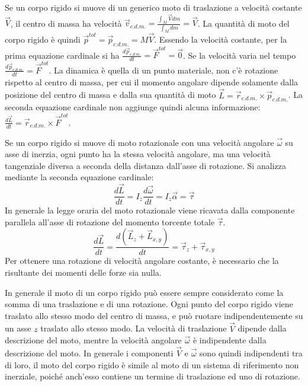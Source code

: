 \documentclass{article}
\numberwithin{equation}{subsection}
\begin{document}
Se un corpo rigido si muove di un generico moto di traslazione a velocità costante $\vec{V}$, 
il centro di massa ha velocità $\vec{v}_{c.d.m.}=\displaystyle\frac{\int_M\vec{V}dm}{\int_M dm}=\vec{V}$. La quantità di moto del corpo rigido è quindi 
$\vec{p}^{tot}=\vec{p}_{c.d.m.}=M\vec{V}$. Essendo la velocità costante, per la prima equazione cardinale si ha $\displaystyle\frac{d\vec{p}_{c.d.m.}}{dt}=\vec{F}^{tot}=\vec0$. 
Se la velocità varia nel tempo $\displaystyle\frac{d\vec{p}_{c.d.m.}}{dt}=\vec{F}^{tot}$. 
La dinamica è quella di un punto materiale, non c'è rotazione rispetto al centro di massa, per cui il 
momento angolare dipende solamente dalla posizione del centro di massa e dalla sua quantità di moto $\vec L=\vec{r}_{c.d.m.}\times\vec{p}_{c.d.m.}$. La seconda 
equazione cardinale non aggiunge quindi alcuna informazione: $\displaystyle\frac{d\vec{L}}{dt}=\vec{r}_{c.d.m.}\times\vec{F}^{tot}$. 



Se un corpo rigido si muove di moto rotazionale con una velocità 
angolare $\vec{\omega}$ su asse di inerzia, ogni punto ha la stessa velocità angolare, ma una velocità tangenziale diversa a seconda della distanza 
dall'asse di rotazione. Si analizza mediante la seconda equazione cardinale:
\begin{equation}
    \displaystyle\frac{d\vec{L}}{dt}=I_z\frac{d\vec\omega}{dt}=I_z\vec\alpha=\vec{\tau}
\end{equation}
In generale la legge oraria del moto rotazionale viene ricavata dalla componente parallela all'asse di rotazione del momento torcente totale $\vec{\tau}$. 
\begin{equation*}
    \displaystyle\frac{d\vec{L}}{dt}=\frac{d(\vec{L}_z+\vec{L}_{x,y})}{dt}=\vec{\tau}_z+\vec{\tau}_{x,y}
\end{equation*}
Per ottenere una rotazione di velocità angolare costante, è necessario che la risultante dei momenti delle forze sia nulla. 



In generale il moto di un corpo rigido può essere sempre considerato come la somma di una traslazione e di una rotazione. Ogni punto del corpo rigido viene traslato 
allo stesso modo del centro di massa, e può ruotare indipendentemente su un asse $z$ traslato allo stesso modo. La velocità di traslazione $\vec{V}$ dipende dalla descrizione 
del moto, mentre la velocità angolare $\vec{\omega}$ è indipendente dalla descrizione del moto. In generale i componenti $\vec{V}$ e $\vec{\omega}$ sono quindi indipendenti 
tra di loro, il moto del corpo rigido è simile al moto di un sistema di riferimento non inerziale, poiché anch'esso contiene un termine di traslazione ed uno di rotazione. 
\end{document}
